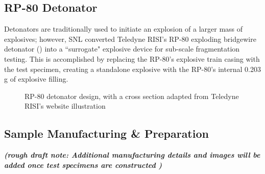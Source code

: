 \subsection{RP-80 Detonator} \label{sec:3_RP80}
Detonators are traditionally used to initiate an explosion of a larger mass of explosives; however, \gls{SNL} converted Teledyne RISI's RP-80 exploding bridgewire detonator () into a ``surrogate" explosive device for sub-scale fragmentation testing. This is accomplished by replacing the RP-80's explosive train casing with the test specimen, creating a standalone explosive with the RP-80's internal 0.203 g of explosive filling. %


\begin{figure}[H]
	\centering
    \caption{RP-80 detonator design, with a cross section adapted from Teledyne RISI's website illustration\cite{TeledyneRP-80}}
	\label{fig:3_RP-80_Layout}
\end{figure}
%


\subsection{Sample Manufacturing \& Preparation} \label{sec:3_Sample_Manufacturing}
\begin{spacing}{1}
\noindent
\textbf{\textit{(rough draft note: Additional manufacturing details and images will be added once test specimens are constructed )}}
\end{spacing}
\vspace{1cm}

